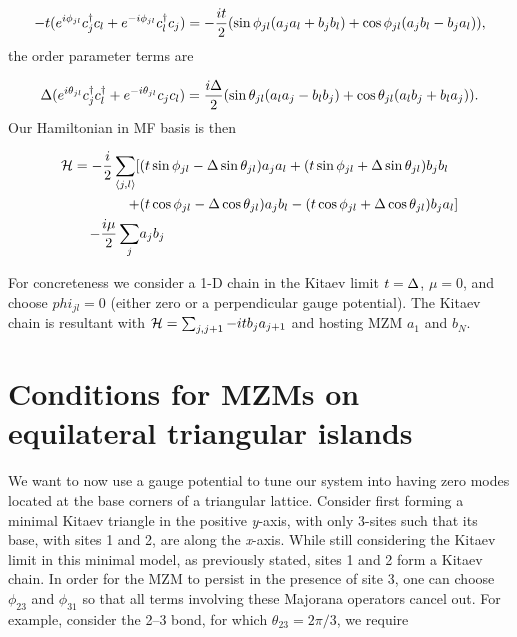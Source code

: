 \begin{equation}
  -t ( e^{i\phi_{jl}} c^{\dagger}_j c_l + e^{-i\phi_{jl}} c^{\dagger}_l c_j) = -\dfrac{it}{2} ( \sin\phi_{jl} (a_j a_l + b_j b_l) + \cos\phi_{jl} (a_j b_l - b_j a_l) ),
\end{equation}
the order parameter terms are

\begin{equation}
  \Delta ( e^{i\theta_{jl}} c^{\dagger}_j c^{\dagger}_l + e^{-i\theta_{jl}} c_j c_l) = \dfrac{i\Delta}{2} ( \sin\theta_{jl} (a_l a_j - b_l b_j) + \cos\theta_{jl} (a_l b_j + b_l a_j) ).
\end{equation}
Our Hamiltonian in MF basis is then

\begin{align}
  \mathcal{H} =  - \dfrac{i}{2} \sum_{\langle j,l\rangle} [&(t\sin\phi_{jl}-\Delta\sin\theta_{jl}) a_j a_l + (t\sin\phi_{jl}+\Delta\sin\theta_{jl}) b_j b_l \nonumber \\
  +&(t\cos\phi_{jl}-\Delta\cos\theta_{jl}) a_j b_l - (t\cos\phi_{jl}+\Delta\cos\theta_{jl}) b_j a_l] \nonumber\\
  -\dfrac{i\mu}{2} \sum_j & a_j b_j
\end{align}

For concreteness we consider a 1-D chain in the Kitaev limit $t=\Delta$, $\mu=0$, and choose $phi_{jl}=0$ (either zero or a perpendicular gauge potential).
The Kitaev chain is resultant with $\mathcal{H} = \sum_{j,j+1} -it b_j a_{j+1}$ and hosting MZM $a_1$ and $b_N$.

\section{Conditions for MZMs on equilateral triangular islands}


We want to now use a gauge potential to tune our system into having zero modes located at the base corners of a triangular lattice.
Consider first forming a minimal Kitaev triangle in the positive \textit{y}-axis, with only 3-sites such that its base, with sites 1 and 2, are along the \textit{x}-axis.
While still considering the Kitaev limit in this minimal model, as previously stated, sites 1 and 2 form a Kitaev chain.
In order for the MZM to persist in the presence of site 3, one can choose $\phi_{23}$ and $\phi_{31}$ so that all terms involving these Majorana operators cancel out.
For example, consider the 2--3 bond, for which $\theta_{23} = 2\pi/3$, we require

